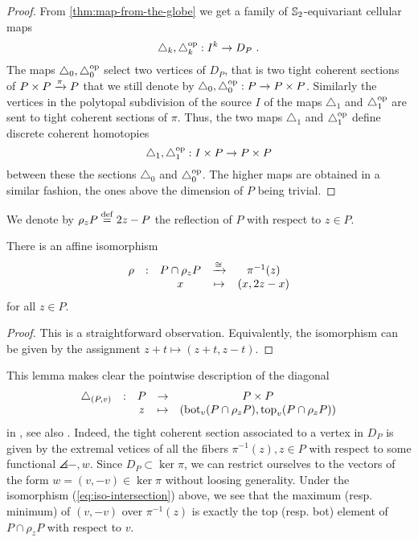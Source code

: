 \begin{proof}
	From \cref{thm:map-from-the-globe} we get a family of $\mathbb{S}_2$-equivariant cellular maps
	\[
	\triangle_k, \triangle_k^{\mathrm{op}} : I^k \to D_P \ . 
	\]
	The maps $\triangle_0, \triangle_0^{\mathrm{op}}$ select two vertices of $D_P$, that is two tight coherent sections of $P\times P \xrightarrow{\pi} P$ that we still denote by $\triangle_0, \triangle_0^{\mathrm{op}} : P \to P\times P$.
	Similarly the vertices in the polytopal subdivision of the source $I$ of the maps $\triangle_1$ and $\triangle_1^{\mathrm{op}}$ are sent to tight coherent sections of $\pi$. 
	Thus, the two maps $\triangle_1$ and $\triangle_1^{\mathrm{op}}$ define discrete coherent homotopies 
	\[
	\triangle_1, \triangle_1^{\mathrm{op}} : I\times P \to P \times P  
	\]
	between these the sections $\triangle_0$ and $\triangle_0^{\mathrm{op}}$. 
	The higher maps are obtained in a similar fashion, the ones above the dimension of $P$ being trivial. 
\end{proof}

We denote by $\rho_z P \stackrel{\mathrm{def}}{=} 2z-P$ the reflection of $P$ with respect to $z \in P$.

\begin{lemma}
	There is an affine isomorphism
	\begin{equation} \label{eq:iso-intersection}
		\begin{matrix}
			\rho & : & P\cap\rho_z P & \xrightarrow{\cong} & \pi^{-1}(z) \\
			& & x  & \mapsto & (x,2z-x)
		\end{matrix}
	\end{equation}
	for all $z \in P$.
\end{lemma}

\begin{proof}
	This is a straightforward observation.
	Equivalently, the isomorphism can be given by the assignment $z+t \mapsto (z+t,z-t)$.
\end{proof}

This lemma makes clear the pointwise description of the diagonal
\begin{equation*}
	\begin{matrix}
		\triangle_{(P,v)} & : & P & \to & P \times P \\
		& & z  & \mapsto & (\operatorname{bot}_v(P \cap \rho_z P),\operatorname{top}_v(P \cap \rho_z P))
	\end{matrix}
\end{equation*}
in \cite[Definition 10]{MTTV19}, see also \cite[Proposition 1.15]{GLA21}.
Indeed, the tight coherent section associated to a vertex in $D_P$ is given by the extremal vetices of all the fibers $\pi^{-1}(z), z \in P$ with respect to some functional $\angles{-,w}$.
Since $D_P \subset \ker \pi$, we can restrict ourselves to the vectors of the form $w=(v,-v) \in \ker \pi$ without loosing generality.
Under the isomorphism (\ref{eq:iso-intersection}) above, we see that the maximum (resp. minimum) of $(v,-v)$ over $\pi^{-1}(z)$ is exactly the top (resp. bot) element of $P\cap \rho_z P$ with respect to $v$.

